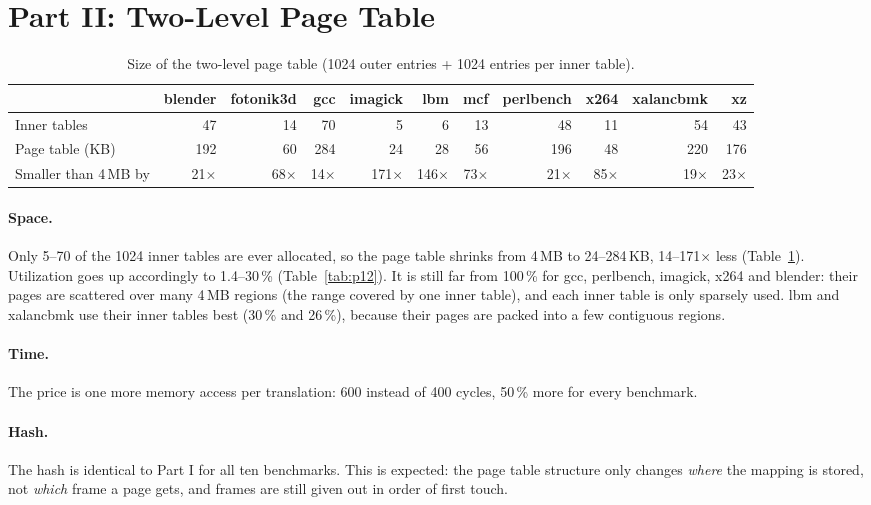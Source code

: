 \documentclass[11pt,a4paper]{article}
\begin{document}
\section{Part II: Two-Level Page Table}

\begin{table}[H]
\centering\footnotesize
\setlength{\tabcolsep}{3.5pt}
\begin{tabular}{@{}lrrrrrrrrrr@{}}
\toprule
& blender & fotonik3d & gcc & imagick & lbm & mcf & perlbench & x264 & xalancbmk & xz \\
\midrule
Inner tables       & 47  & 14 & 70  & 5  & 6  & 13 & 48  & 11 & 54  & 43 \\
Page table (KB)    & 192 & 60 & 284 & 24 & 28 & 56 & 196 & 48 & 220 & 176 \\
Smaller than 4\,MB by & 21$\times$ & 68$\times$ & 14$\times$ & 171$\times$ & 146$\times$ & 73$\times$ & 21$\times$ & 85$\times$ & 19$\times$ & 23$\times$ \\
\bottomrule
\end{tabular}
\caption{Size of the two-level page table (1024 outer entries + 1024 entries per inner table).}
\label{tab:p2}
\end{table}

\paragraph{Space.} Only 5--70 of the 1024 inner tables are ever allocated, so the page table
shrinks from 4\,MB to 24--284\,KB, 14--171$\times$ less (Table~\ref{tab:p2}). Utilization goes up
accordingly to 1.4--30\,\% (Table~\ref{tab:p12}). It is still far from 100\,\% for gcc,
perlbench, imagick, x264 and blender: their pages are scattered over many 4\,MB regions (the range
covered by one inner table), and each inner table is only sparsely used. lbm and xalancbmk use
their inner tables best (30\,\% and 26\,\%), because their pages are packed into a few contiguous
regions.

\paragraph{Time.} The price is one more memory access per translation: 600 instead of 400 cycles,
50\,\% more for every benchmark.

\paragraph{Hash.} The hash is identical to Part I for all ten benchmarks. This is expected: the
page table structure only changes \emph{where} the mapping is stored, not \emph{which} frame a page
gets, and frames are still given out in order of first touch.
\end{document}

